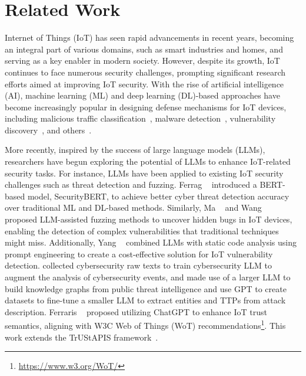 \section{Related Work}\label{sec:relatedwork}

Internet of Things (IoT) has seen rapid advancements in recent years, becoming an integral part of various domains, such as smart industries and homes, and serving as a key enabler in modern society.
However, despite its growth, IoT continues to face numerous security challenges, prompting significant research efforts aimed at improving IoT security.
With the rise of artificial intelligence (AI), machine learning (ML) and deep learning (DL)-based approaches have become increasingly popular in designing defense mechanisms for IoT devices, including malicious traffic classification~\cite{luo2022transformer,shafiq2020corrauc}, malware detection~\cite{vasan2020mthael,chaganti2022deep,aung2022atlas}, vulnerability discovery~\cite{neshenko2019demystifying}, and others~\cite{al2020survey,otoum2022dl,tambe2019detection}.

More recently, inspired by the success of large language models (LLMs), researchers have begun exploring the potential of LLMs to enhance IoT-related security tasks.
For instance, LLMs have been applied to existing IoT security challenges such as threat detection and fuzzing. Ferrag \etal~\cite{sokiotllm} introduced a BERT-based model, SecurityBERT, to achieve better cyber threat detection accuracy over traditional ML and DL-based methods. 
Similarly, Ma \etal~\cite{ma} and Wang \etal~\cite{llmiotfuz} proposed LLM-assisted fuzzing methods to uncover hidden bugs in IoT devices, enabling the detection of complex vulnerabilities that traditional techniques might miss.
Additionally, Yang \etal~\cite{yang2023iot} combined LLMs with static code analysis using prompt engineering to create a cost-effective solution for IoT vulnerability detection.
\cite{ji2024sevenllm} collected cybersecurity raw texts to train cybersecurity LLM to augment the analysis of cybersecurity events, and \cite{llmtikg} made use of a larger LLM to build knowledge graphs from public threat intelligence and use GPT to create datasets to fine-tune a smaller LLM to extract entities and TTPs from attack description.
Ferraris \etal~\cite{ferraris2024ici} proposed utilizing ChatGPT to enhance IoT trust semantics, aligning with W3C Web of Things (WoT) recommendations\footnote{\scriptsize \url{https://www.w3.org/WoT/}}.
This work extends the TrUStAPIS framework~\cite{ferraris2020trustapis}.

